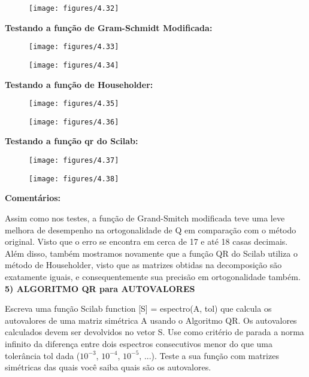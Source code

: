 \documentclass[leqno]{article}
\numberwithin{equation}{section}
\begin{document}
	\begin{figure}[H]
		\centering
		\texttt{[image: figures/4.32]}		
	\end{figure}

	\noindent \textbf{{\large Testando a função de Gram-Schmidt Modificada:}}
	\begin{figure}[H]
		\centering
		\texttt{[image: figures/4.33]}		
	\end{figure}

	\begin{flushleft}
		\begin{figure}[H]
		\centering
		\texttt{[image: figures/4.34]}		
	\end{figure}
	\end{flushleft}
	\newpage
	\textbf{{\large Testando a função de Householder:}} 
	
	\begin{figure}[H]
		\centering
		\texttt{[image: figures/4.35]}		
	\end{figure}

	\begin{figure}[H]
		\centering
		\texttt{[image: figures/4.36]}		
	\end{figure}
	\newpage
	\textbf{{\large Testando a função qr do Scilab:}}

	\begin{figure}[H]
		\centering
		\texttt{[image: figures/4.37]}		
	\end{figure}

	\begin{figure}[H]
		\centering
		\texttt{[image: figures/4.38]}		
	\end{figure}

	\textbf{{\large Comentários: }}
	
	Assim como nos testes, a função de Grand-Smitch modificada teve uma leve melhora de desempenho na ortogonalidade de Q em comparação com o método original. Visto que o erro se encontra em cerca de 17 e até 18 casas decimais. Além disso, também mostramos novamente que a função QR do Scilab utiliza o método de Householder, visto que as matrizes obtidas na decomposição são exatamente iguais, e consequentemente sua precisão em ortogonalidade também.\\
	
	\textbf{{\large	5) ALGORITMO QR para AUTOVALORES}}
	
	\begin{tcolorbox}[colback=green!5,colframe=green!40!black]
		Escreva uma função Scilab function [S] = espectro(A, tol) que calcula os autovalores
		de uma matriz simétrica A usando o Algoritmo QR. Os autovalores calculados devem
		ser devolvidos no vetor S. Use como critério de parada a norma infinito da diferença
		entre dois espectros consecutivos menor do que uma tolerância tol dada ($10^{-3}$, $10^{-4}$,
		$10^{-5}$, ...). Teste a sua função com matrizes simétricas das quais você saiba quais são
		os autovalores.
	\end{tcolorbox}
\end{document}
